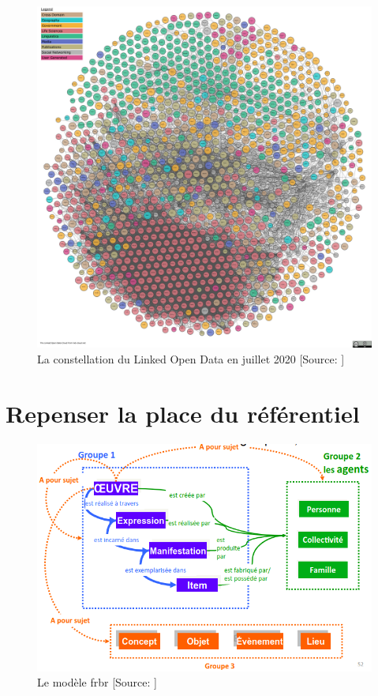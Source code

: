\begin{figure}[!h]
	\centering
	\includegraphics[width=16cm]{images/lod-cloud-sm.jpg}
	\caption[La constellation du Linked Open Data en juillet 2020]{La constellation du Linked Open Data en juillet 2020 [Source: \cite{noauthor_linked_2020}]}
	\label{lod_cloud}
\end{figure}

\chapter{\label{annexe_nvx_modeles}Repenser la place du référentiel}

\begin{figure}[!h]
	\centering
	\includegraphics[width=16cm]{images/frbr_slide.png}
	\caption[Le modèle \ac{frbr}]{Le modèle \ac{frbr} [Source: \cite[s.52]{benezet_participer_2015}]}
	\label{frbr}
\end{figure}

